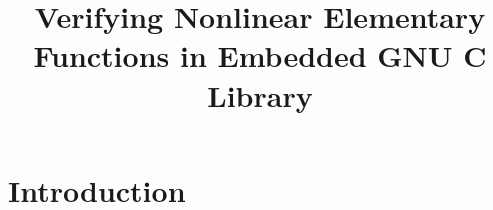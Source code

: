 \documentclass{acm_proc_article-sp}
\begin{document}
\title{Verifying Nonlinear Elementary Functions in Embedded GNU C
  Library}

\maketitle
\begin{abstract}

\end{abstract}


\section{Introduction}
\end{document}
